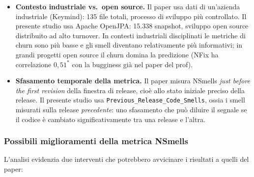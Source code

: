 \begin{itemize}
  È importante distinguere due concetti diversi. La \textit{correlazione individuale} di
  NSmells con isBuggy (misurata da InfoGain o Spearman) è positiva e non nulla anche nel
  presente studio: per questo la feature selection con soglia $= 0$ non elimina NSmells,
  e il classificatore migliore risulta comunque quello senza FS (FS è un no-op quando
  tutte le feature hanno InfoGain $> 0$). Il \textit{contributo marginale} di NSmells
  nel modello --- cioè quanto cambia la predizione se si varia NSmells \textit{tenendo
  fisse} le altre 18 feature --- è invece quasi zero: RandomForest ha già spiegato la
  quasi totalità della varianza di isBuggy tramite le metriche di processo; NSmells non
  aggiunge informazione indipendente. È questo contributo marginale, non la correlazione
  individuale, che il what-if misura e che risulta marginale.

  \item \textbf{Contesto industriale vs.\ open source.}
  Il paper usa dati di un'azienda industriale (Keymind): 135 file totali, processo di
  sviluppo più controllato. Il presente studio usa Apache OpenJPA: 15.338 snapshot, sviluppo
  open source distribuito ad alto turnover. In contesti industriali disciplinati le metriche
  di churn sono più basse e gli smell diventano relativamente più informativi; in grandi
  progetti open source il churn domina la predizione (NFix ha correlazione $0{,}51^{*}$ con
  la bugginess già nel paper del prof).

  \item \textbf{Sfasamento temporale della metrica.}
  Il paper misura NSmells \textit{just before the first revision} della finestra di release,
  cioè allo stato iniziale preciso della release. Il presente studio usa
  \texttt{Previous\_Release\_Code\_Smells}, ossia i smell misurati sulla release
  \textit{precedente}: uno sfasamento che può diluire il segnale se il codice è cambiato
  significativamente tra una release e l'altra.

\end{itemize}

\subsubsection{Possibili miglioramenti della metrica NSmells}

L'analisi evidenzia due interventi che potrebbero avvicinare i risultati a quelli del paper:

